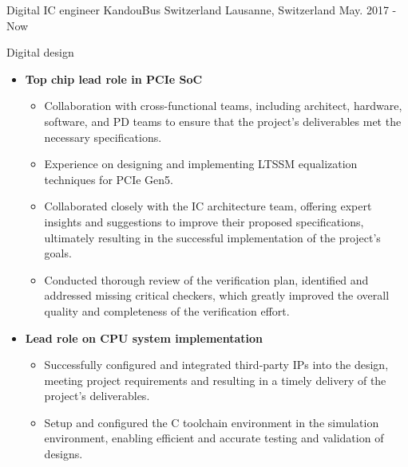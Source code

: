 

\begin{cventries}

  \cventry
    {Digital IC engineer} %
    {KandouBus Switzerland} %
    {Lausanne, Switzerland} %
    {May. 2017 - Now} %
    {
      \begin{cvitems} %
        \item {Digital design}
        \begin{itemize}
          \item {\textbf{Top chip lead role in PCIe SoC}}
          \begin{itemize}
            \item {Collaboration with cross-functional teams, including architect, hardware, software, and PD teams to ensure that the project's deliverables met the necessary specifications.}
            \item {Experience on designing and implementing LTSSM equalization techniques for PCIe Gen5.}
            \item {Collaborated closely with the IC architecture team, offering expert insights and suggestions to improve their proposed specifications, ultimately resulting in the successful implementation of the project's goals.}
            \item {Conducted thorough review of the verification plan, identified and addressed missing critical checkers, which greatly improved the overall quality and completeness of the verification effort.}
          \end{itemize}
          \item {\textbf{Lead role on CPU system implementation}}
          \begin{itemize}
            \item {Successfully configured and integrated third-party IPs into the design, meeting project requirements and resulting in a timely delivery of the project's deliverables.}
            \item {Setup and configured the C toolchain environment in the simulation environment, enabling efficient and accurate testing and validation of designs.}

\end{itemize}
\end{itemize}
\end{cvitems}}
\end{cventries}
